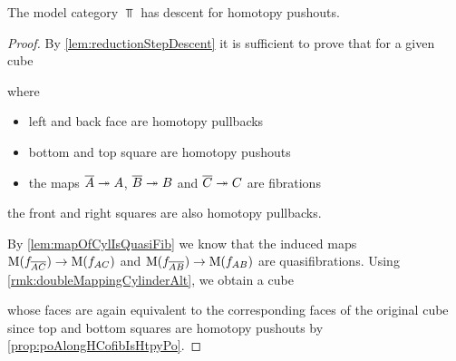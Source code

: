 \begin{prop}\label{lem:topDescentPoAlt}
    The model category $\Top$ has descent for homotopy pushouts. 
    \begin{proof}
        By \cref{lem:reductionStepDescent} it is sufficient to prove that for a given cube
        \begin{center}
        \end{center}
        where 
        \begin{itemize}
            \item left and back face are homotopy pullbacks
            \item bottom and top square are homotopy pushouts
            \item the maps $\overline{A}\xtwoheadrightarrow{} A$, $\overline{B}\xtwoheadrightarrow{} B$ and $\overline{C}\xtwoheadrightarrow{} C$ are fibrations
        \end{itemize}
        the front and right squares are also homotopy pullbacks.

        By \cref{lem:mapOfCylIsQuasiFib} we know that the induced maps $\operatorname{M}(f_{\overline{A}\overline{C}})\to\operatorname{M}(f_{AC})$ and $\operatorname{M}(f_{\overline{A}\overline{B}})\to\operatorname{M}(f_{AB})$ are quasifibrations.
        Using \cref{rmk:doubleMappingCylinderAlt}, we obtain a cube
        \begin{center}
        \end{center}
        whose faces are again equivalent to the corresponding faces of the original cube since top and bottom squares are homotopy pushouts by \cref{prop:poAlongHCofibIsHtpyPo}.
        

\end{proof}
\end{prop}
